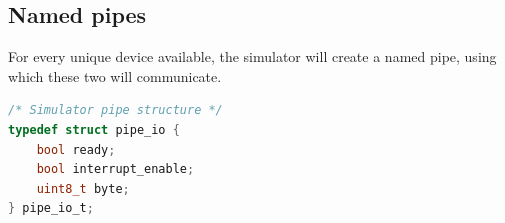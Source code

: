 \subsection{Named pipes}
For every unique device available, the simulator will create a named pipe,
using which these two will communicate.

\begin{lstlisting}[language=c]
/* Simulator pipe structure */
typedef struct pipe_io {
	bool ready;
	bool interrupt_enable;
	uint8_t byte;
} pipe_io_t;

\end{lstlisting}

